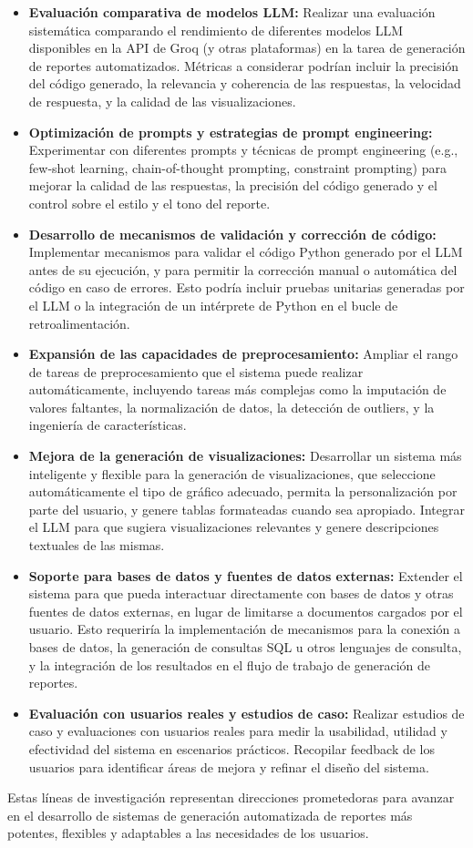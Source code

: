 \begin{itemize}
	\item \textbf{Evaluación comparativa de modelos LLM:}  Realizar una evaluación sistemática comparando el rendimiento de diferentes modelos LLM disponibles en la API de Groq (y otras plataformas) en la tarea de generación de reportes automatizados.  Métricas a considerar podrían incluir la precisión del código generado,  la relevancia y coherencia de las respuestas,  la velocidad de respuesta,  y la calidad de las visualizaciones.
	\item \textbf{Optimización de prompts y estrategias de prompt engineering:}  Experimentar con diferentes prompts y técnicas de prompt engineering (e.g., few-shot learning, chain-of-thought prompting, constraint prompting) para mejorar la calidad de las respuestas,  la precisión del código generado y el control sobre el estilo y el tono del reporte.
	\item \textbf{Desarrollo de mecanismos de validación y corrección de código:}  Implementar mecanismos para validar el código Python generado por el LLM antes de su ejecución,  y para permitir la corrección manual o automática del código en caso de errores.  Esto podría incluir pruebas unitarias generadas por el LLM o la integración de un intérprete de Python en el bucle de retroalimentación.
	\item \textbf{Expansión de las capacidades de preprocesamiento:}  Ampliar el rango de tareas de preprocesamiento que el sistema puede realizar automáticamente,  incluyendo tareas más complejas como la imputación de valores faltantes,  la normalización de datos,  la detección de outliers,  y la ingeniería de características.
	\item \textbf{Mejora de la generación de visualizaciones:}  Desarrollar un sistema más inteligente y flexible para la generación de visualizaciones,  que seleccione automáticamente el tipo de gráfico adecuado,  permita la personalización por parte del usuario,  y genere tablas formateadas cuando sea apropiado.  Integrar el LLM para que sugiera visualizaciones relevantes y genere descripciones textuales de las mismas.
	\item \textbf{Soporte para bases de datos y fuentes de datos externas:}  Extender el sistema para que pueda interactuar directamente con bases de datos y otras fuentes de datos externas,  en lugar de limitarse a documentos cargados por el usuario.  Esto requeriría la implementación de mecanismos para la conexión a bases de datos,  la generación de consultas SQL u otros lenguajes de consulta,  y la integración de los resultados en el flujo de trabajo de generación de reportes.
	\item \textbf{Evaluación con usuarios reales y estudios de caso:}  Realizar estudios de caso y evaluaciones con usuarios reales para medir la usabilidad,  utilidad y efectividad del sistema en escenarios prácticos.  Recopilar feedback de los usuarios para identificar áreas de mejora y refinar el diseño del sistema.
\end{itemize}

Estas líneas de investigación representan direcciones prometedoras para avanzar en el desarrollo de sistemas de generación automatizada de reportes más potentes,  flexibles y adaptables a las necesidades de los usuarios.